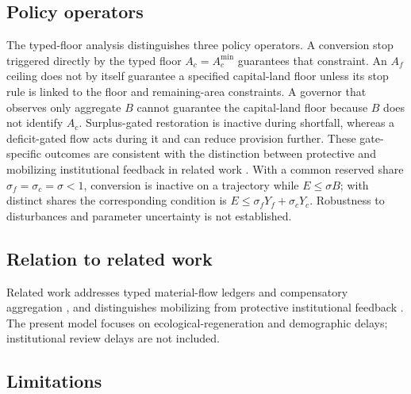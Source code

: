 \documentclass[preprint,12pt,authoryear]{elsarticle}
\newcommand{\Acmin}{A_c^{\min}}
\begin{document}
\subsection{Policy operators}

The typed-floor analysis distinguishes three policy operators. A conversion stop triggered directly by the typed floor $A_c=\Acmin$ guarantees that constraint. An $A_f$ ceiling does not by itself guarantee a specified capital-land floor unless its stop rule is linked to the floor and remaining-area constraints. A governor that observes only aggregate $B$ cannot guarantee the capital-land floor because $B$ does not identify $A_c$. Surplus-gated restoration is inactive during shortfall, whereas a deficit-gated flow acts during it and can reduce provision further. These gate-specific outcomes are consistent with the distinction between protective and mobilizing institutional feedback in related work \citep{Abaee2026a}. With a common reserved share $\sigma_f=\sigma_c=\sigma<1$, conversion is inactive on a trajectory while $E\le\sigma B$; with distinct shares the corresponding condition is $E\le\sigma_fY_f+\sigma_cY_c$. Robustness to disturbances and parameter uncertainty is not established.

\subsection{Relation to related work}

Related work addresses typed material-flow ledgers and compensatory aggregation \citep{Abaee2026b,Abaee2026c}, and distinguishes mobilizing from protective institutional feedback \citep{Abaee2026a}. The present model focuses on ecological-regeneration and demographic delays; institutional review delays are not included.

\subsection{Limitations}
\end{document}
